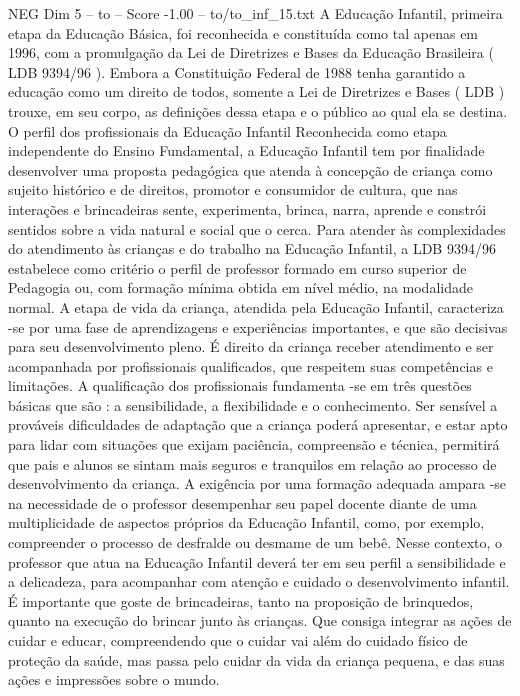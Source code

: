 \begin{textsample}{NEG Dim 5 – to – Score -1.00 – to/to\_inf\_15.txt}  \label{ex:f5_neg_265}
A Educação Infantil, primeira etapa da Educação Básica, foi reconhecida e constituída como tal apenas em 1996, com a promulgação da Lei de Diretrizes e Bases da Educação Brasileira ( LDB 9394/96 ).
Embora a Constituição Federal de 1988 tenha garantido a educação como um direito de todos, somente a Lei de Diretrizes e Bases ( LDB ) trouxe, em seu corpo, as definições dessa etapa e o público ao qual ela se destina.
O perfil dos profissionais da Educação Infantil Reconhecida como etapa independente do Ensino Fundamental, a Educação Infantil tem por finalidade desenvolver uma proposta pedagógica que atenda à concepção de criança como sujeito histórico e de direitos, promotor e consumidor de cultura, que nas interações e brincadeiras sente, experimenta, brinca, narra, aprende e constrói sentidos sobre a vida natural e social que o cerca.
Para atender às complexidades do atendimento às crianças e do trabalho na Educação Infantil, a LDB 9394/96 estabelece como critério o perfil de professor formado em curso superior de Pedagogia ou, com formação mínima obtida em nível médio, na modalidade normal.
A etapa de vida da criança, atendida pela Educação Infantil, caracteriza -se por uma fase de aprendizagens e experiências importantes, e que são decisivas para seu desenvolvimento pleno.
É direito da criança receber atendimento e ser acompanhada por profissionais qualificados, que respeitem suas competências e limitações.
A qualificação dos profissionais fundamenta -se em três questões básicas que são : a sensibilidade, a flexibilidade e o conhecimento.
Ser sensível a prováveis dificuldades de adaptação que a criança poderá apresentar, e estar apto para lidar com situações que exijam paciência, compreensão e técnica, permitirá que pais e alunos se sintam mais seguros e tranquilos em relação ao processo de desenvolvimento da criança.
A exigência por uma formação adequada ampara -se na necessidade de o professor desempenhar seu papel docente diante de uma multiplicidade de aspectos próprios da Educação Infantil, como, por exemplo, compreender o processo de desfralde ou desmame de um bebê.
Nesse contexto, o professor que atua na Educação Infantil deverá ter em seu perfil a sensibilidade e a delicadeza, para acompanhar com atenção e cuidado o desenvolvimento infantil.
É importante que goste de brincadeiras, tanto na proposição de brinquedos, quanto na execução do brincar junto às crianças.
Que consiga integrar as ações de cuidar e educar, compreendendo que o cuidar vai além do cuidado físico de proteção da saúde, mas passa pelo cuidar da vida da criança pequena, e das suas ações e impressões sobre o mundo.

\end{textsample}
